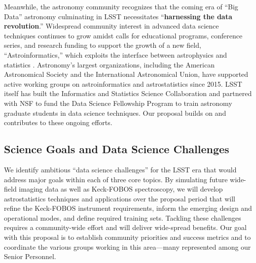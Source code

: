 \documentclass[oneside,11pt]{amsart}
\begin{document}
Meanwhile, the astronomy community recognizes that the coming era of ``Big Data'' astronomy culminating in LSST
necessitates ``\textbf{harnessing the data revolution}.''  Widespread community interest in advanced data science
techniques continues to grow amidst calls for educational programs, conference series, and research funding to support
the growth of a new field, ``Astroinformatics,'' which exploits the interface between astrophysics and statistics
\citep{borne09}.  Astronomy's largest organizations, including the American Astronomical Society and the International
Astronomical Union, have supported active working groups on astroinformatics and astrostatistics since 2015.  LSST
itself has built the Informatics and Statistics Science Collaboration and partnered with NSF to fund the Data Science
Fellowship Program to train astronomy graduate students in data science techniques.  Our proposal builds on and
contributes to these ongoing efforts.




\subsection{Science Goals and Data Science Challenges}
\label{sec:goals}

We identify ambitious ``data science challenges'' for the LSST era that would address major goals within each of three
core topics.  By simulating future wide-field imaging data as well as Keck-FOBOS spectroscopy, we will develop
astrostatistics techniques and applications over the proposal period that will refine the Keck-FOBOS instrument
requirements, inform the emerging design and operational modes, and define required training sets.  Tackling these
challenges requires a community-wide effort and will deliver wide-spread benefits.  Our goal with this
proposal is to establish community priorities and success metrics and to coordinate the various groups working in this
area---many represented among our Senior Personnel.
\end{document}
